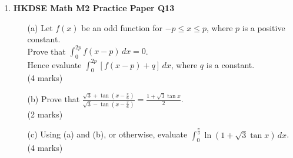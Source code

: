 \documentclass[12pt]{article}
\begin{document}
\begin{enumerate}
	\item \textbf{HKDSE Math M2 Practice Paper Q13}
	\begin{enumerate}
		\item[(a)]Let $f(x)$ be an odd function for $-p \leq x \leq p$, where $p$ is a positive constant.\\
		Prove that $\displaystyle\int_0^{2p} f(x-p)\,dx = 0$.\\
		Hence evaluate $\displaystyle\int_0^{2p} [f(x-p)+q]\,dx $, where $q$ is a constant. \\(4 marks)
		\item[(b)]Prove that $\displaystyle\frac{\sqrt{3} + \tan{\left(x - \displaystyle\frac{\pi}{6}\right)}}{\sqrt{3} - \tan{\left(x - \displaystyle\frac{\pi}{6}\right)}} = \frac{1+\sqrt{3}\tan{x}}{2}$. \\(2 marks)
		\item[(c)]Using (a) and (b), or otherwise, evaluate $\displaystyle\int_0^{\frac{\pi}{3}} \ln{(1 + \sqrt{3}\tan{x})} \,dx$. \\(4 marks)
	\end{enumerate}


\end{enumerate}
\end{document}
